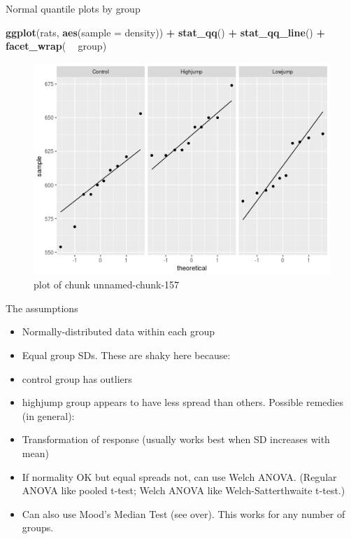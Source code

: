 \documentclass[ignorenonframetext,]{beamer}
\newenvironment{Shaded}{\begin{snugshade}}{\end{snugshade}}
\newcommand{\DataTypeTok}[1]{\textcolor[rgb]{0.13,0.29,0.53}{#1}}
\newcommand{\KeywordTok}[1]{\textcolor[rgb]{0.13,0.29,0.53}{\textbf{#1}}}
\newcommand{\NormalTok}[1]{#1}
\newcommand{\OperatorTok}[1]{\textcolor[rgb]{0.81,0.36,0.00}{\textbf{#1}}}
\newcommand{\StringTok}[1]{\textcolor[rgb]{0.31,0.60,0.02}{#1}}
\providecommand{\tightlist}{%
  \setlength{\itemsep}{0pt}\setlength{\parskip}{0pt}}
\begin{document}
\begin{frame}[fragile]{Normal quantile plots by group}
\protect\hypertarget{normal-quantile-plots-by-group}{}

\begin{Shaded}
\begin{Highlighting}[]
\KeywordTok{ggplot}\NormalTok{(rats, }\KeywordTok{aes}\NormalTok{(}\DataTypeTok{sample =}\NormalTok{ density)) }\OperatorTok{+}\StringTok{ }\KeywordTok{stat_qq}\NormalTok{() }\OperatorTok{+}\StringTok{ }\KeywordTok{stat_qq_line}\NormalTok{() }\OperatorTok{+}
\StringTok{  }\KeywordTok{facet_wrap}\NormalTok{( }\OperatorTok{~}\StringTok{ }\NormalTok{group)}
\end{Highlighting}
\end{Shaded}

\begin{figure}
\centering
\includegraphics{figure/unnamed-chunk-157-1.png}
\caption{plot of chunk unnamed-chunk-157}
\end{figure}

\end{frame}

\begin{frame}{The assumptions}
\protect\hypertarget{the-assumptions}{}

\begin{itemize}
\tightlist
\item
  Normally-distributed data within each group
\item
  Equal group SDs. These are shaky here because:
\item
  control group has outliers
\item
  highjump group appears to have less spread than others. Possible
  remedies (in general):
\item
  Transformation of response (usually works best when SD increases with
  mean)
\item
  If normality OK but equal spreads not, can use Welch ANOVA. (Regular
  ANOVA like pooled t-test; Welch ANOVA like Welch-Satterthwaite
  t-test.)
\item
  Can also use Mood's Median Test (see over). This works for any number
  of groups.
\end{itemize}

\end{frame}
\end{document}

